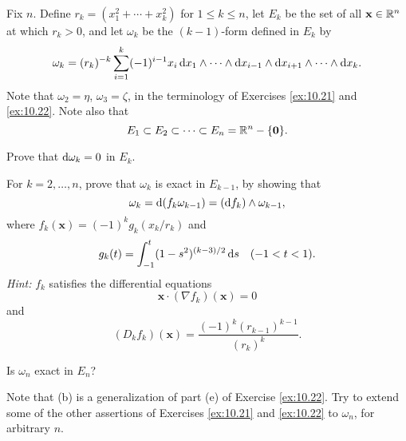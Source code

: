 \begin{myexercise}
    \label{ex:10.23}
    Fix $n$.
    Define $r_k = (x_1^2 + \cdots + x_k^2)$ for $1 \leq k \leq n$, let $E_k$ be the set of all $\mathbf{x} \in {\protect\mathbb R}^n$ at which $r_k > 0$, and let $\omega_k$ be the $(k - 1)$-form defined in $E_k$ by
    \begin{equation*}
        \omega_k = (r_k)^{-k} \sum_{i=1}^{k} (-1)^{i-1} x_i
        \d x_1 \wedge \cdots \wedge
        \d x_{i-1} \wedge
        \d x_{i+1} \wedge \cdots \wedge
        \d x_k .
    \end{equation*}
    Note that $\omega_2 = \eta$, $\omega_3 = \zeta$, in the terminology of Exercises \ref{ex:10.21} and \ref{ex:10.22}.
    Note also that
    \begin{equation*}
        E_1 \subset
        E_2 \subset
        \cdots \subset
        E_n = {\protect\mathbb R}^n - \{\mathbf{0}\} .
    \end{equation*}
    \begin{asparaenum}[(a)]
        \item Prove that $\d \omega_k = 0$ in $E_k$.
        \item For $k=2,\dots,n$, prove that $\omega_k$ is exact in $E_{k-1}$, by showing that
        \begin{equation*}
            \omega_k = \d (f_k \omega_{k-1})
            = (\d f_k) \wedge \omega_{k-1} ,
        \end{equation*}
        where $f_k(\mathbf{x})=(-1)^k g_k(x_k/r_k)$ and
        \begin{equation*}
            g_k(t)=\int_{-1}^{t}(1-s^2)^{(k-3)/2} \d s
            \quad (-1<t<1).
        \end{equation*}
        \emph{Hint:} $f_k$ satisfies the differential equations
        \begin{equation*}
            \mathbf{x} \cdot (\nabla f_k)(\mathbf{x}) = 0
        \end{equation*}
        and
        \begin{equation*}
            (D_k f_k)(\mathbf{x}) = \frac{(-1)^k(r_{k-1})^{k-1}}{(r_k)^k}.
        \end{equation*}
        \item Is $\omega_n$ exact in $E_n$?
        \item Note that (b) is a generalization of part (e) of Exercise \ref{ex:10.22}.
        Try to extend some of the other assertions of Exercises \ref{ex:10.21} and \ref{ex:10.22} to $\omega_n$, for arbitrary $n$.
    \end{asparaenum}
\end{myexercise}


